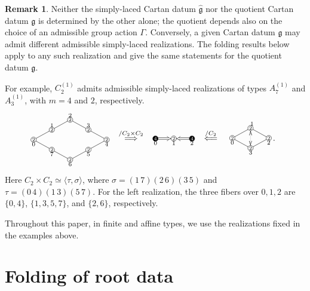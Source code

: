 \documentclass[12pt, leqno]{amsart}
\numberwithin{equation}{section}
\theoremstyle{plain}
\theoremstyle{definition}
\newtheorem{remark}[lemma]{Remark}
\newcommand{\g}{\mathfrak{g}}
\newcommand*\circled[1]{ \fontsize{6}{6}\selectfont \tikz[baseline=(char.base)]{
  \node[shape=circle,draw,inner sep=0.4pt] (char) {#1};} \fontsize{12}{12}\selectfont }
\newcommand*\bcircled[1]{\fontsize{6}{6}\selectfont \tikz[baseline=(char.base)]{
    \node[shape=circle, fill= black, draw=black, text=white,  inner sep=0.4pt] (char) {#1};} \fontsize{12}{12}\selectfont}
\newcommand{\hg}{{\widehat{\g}}}
\begin{document}
\begin{remark}
Neither the simply-laced Cartan datum $\hg$ nor the quotient Cartan
datum $\g$ is determined by the other alone; the quotient depends also
on the choice of an admissible group action $\Gamma$.
Conversely, a given Cartan datum $\g$ may admit different admissible
simply-laced realizations.
The folding results below apply to any such realization and give the
same statements for the quotient datum $\g$.

For example, $C_2^{(1)}$ admits admissible simply-laced realizations
of types $A_7^{(1)}$ and $A_3^{(1)}$, with $m=4$ and $2$,
respectively.
\begin{align*}
\raisebox{2.5em}{
\xymatrix@R=1ex@C=3.5ex{
&& *{\circled{2}}<3pt>
\ar@{-}[dl]
\ar@{-}[dr]
\ar@{}[r]^<{ 2 \ \ }
&
\\
&
*{\circled{2}}<3pt>
\ar@{}[r]^<{1 \ \ }
&
&
*{\circled{2}}<3pt>
\ar@{}[l]_<{ \ \ 3}
\\
*{\circled{2}}<3pt>
\ar@{}[r]_<{0 \ \ }
\ar@{-}[dr]
\ar@{-}[ur]
&&&&
*{\circled{2}}<3pt>
\ar@{-}[dl]
\ar@{-}[ul]
\ar@{}[l]^<{ \ \ 4}
\\
&
*{\circled{2}}<3pt>
\ar@{}[r]_<{7 \ \ }
&
&
*{\circled{2}}<3pt>
\ar@{}[l]^<{ \ \ 5}
\\
&&
*{\circled{2}}<3pt>
\ar@{-}[ul]
\ar@{-}[ur]
\ar@{}[r]_<{6 \ \ }
&
}}
\ \
&\overset{/C_2 \times C_2}{\Longrightarrow}
\ \
\xymatrix@R=0.5ex@C=3.5ex{
*{\bcircled{4}}<3pt>
      \ar@{=>}[r]_<{0\ \ }
&
*{\circled{2}}<3pt>
       \ar@{}[r]_<{1\ \ }
&
*{\bcircled{4}}<3pt>
      \ar@{=>}[l]^<{ \ \ 2 }
}
\ \
\overset{/C_2}{\Longleftarrow}
\ \
\raisebox{1.5em}{
\xymatrix@R=1ex@C=3.5ex{
& *{\circled{2}}<3pt>
\ar@{-}[dl] \ar@{-}[dr]
\ar@{}[r]^<{ 1 \ }
\ar@{<.>}[dd]
&
\\
*{\circled{2}}<3pt>
\ar@{}[r]_<{0 \ \ }
&
&
*{\circled{2}}<3pt>
\ar@{}[l]^<{ \ \ 2}
\\
&*{\circled{2}}<3pt>
\ar@{-}[ul] \ar@{-}[ur]
\ar@{}[r]_<{3 \ \ }
&
}}.
\end{align*}
Here $C_2\times C_2\simeq\langle\tau,\sigma\rangle$, where
$\sigma=(1\,7)(2\,6)(3\,5)$ and $\tau=(0\,4)(1\,3)(5\,7)$.
For the left realization, the three fibers over $0,1,2$ are
$\{0,4\}$, $\{1,3,5,7\}$, and $\{2,6\}$, respectively.

Throughout this paper, in finite and affine types, we use the realizations fixed in the examples above.
\end{remark}

\section{Folding of root data} \label{sec: folding of roots}
\end{document}
